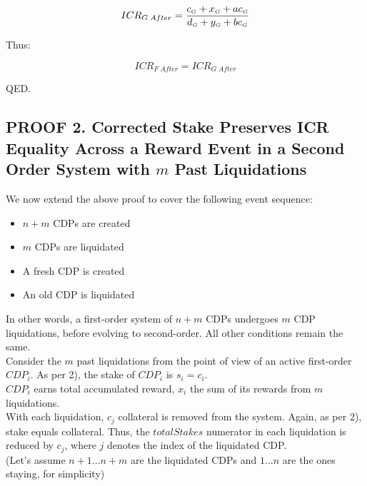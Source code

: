 \documentclass[reqno]{article}
\begin{document}
\begin{equation} 
    ICR_{G \; After}=\frac{c_\mathsmaller{G}+x_\mathsmaller{G}+ac_\mathsmaller{G}}{d_\mathsmaller{G}+y_\mathsmaller{G}+bc_\mathsmaller{G}}
\end{equation}

\bigskip
Thus:

\begin{equation} 
    ICR_{F \; After}=ICR_{G \; After}
\end{equation}

\bigskip
QED.

\subsection*{PROOF 2. Corrected Stake Preserves ICR Equality Across a Reward Event in a Second Order System with $m$ Past Liquidations}

We now extend the above proof to cover the following event sequence:

\begin{itemize}
  \item $n+m$ CDPs are created
  \item $m$ CDPs are liquidated
  \item A fresh CDP is created
  \item An old CDP is liquidated
\end{itemize}

\bigskip
In other words, a first-order system of $n+m$ CDPs undergoes $m$ CDP liquidations, before evolving to second-order.  All other conditions remain the same.\\

Consider the $m$ past liquidations from the point of view of an active first-order $CDP_i$. As per 2), the stake of $CDP_i$ is $s_i = c_i$.\\

$CDP_i$ earns total accumulated reward, $x_i$  the sum of its rewards from $m$ liquidations.\\

With each liquidation, $c_j$ collateral is removed from the system. Again, as per 2), stake equals collateral. Thus, the $totalStakes$ numerator in each liquidation is reduced by $c_j$, where $j$ denotes the index of the liquidated CDP.\\ 

(Let’s assume $n+1 ... n+m$ are the liquidated CDPs and $1 ... n$ are the ones staying, for simplicity)\\
\end{document}
